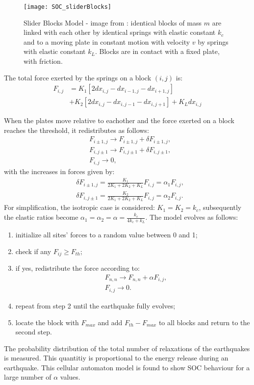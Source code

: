 \begin{figure}[!h]
  \centering
  \texttt{[image: SOC\_sliderBlocks]}
  \caption{Slider Blocks Model - image from \cite{sliderblock}: identical blocks of mass $m$ are linked with each other by identical springs with elastic constant $k_c$ and to a moving plate in constant motion with velocity $v$ by springs with elastic constant $k_L$. Blocks are in contact with a fixed plate, with friction.}
  \label{fig:sliderBlock}
\end{figure}

The total force exerted by the springs on a block $(i,j)$ is:
\begin{align}
F_{i,j} &= K_1[2dx_{i,j}-dx_{i-1,j}-dx_{i+1,j}]\\
&+K_2[2dx_{i,j}-dx_{i,j-1}-dx_{i,j+1}]+K_Ldx_{i,j}
\end{align}

When the plates move relative to eachother and the force exerted on a block reaches the threshold, it redistributes as follows:
\begin{align}
&F_{i \pm 1,j} \to F_{i \pm 1,j} + \delta F_{i \pm 1,j},\\
&F_{i,j \pm 1} \to F_{i,j \pm 1} + \delta F_{i,j \pm 1},\\
&F_{i,j} \to 0,
\end{align}
with the increases in forces given by:
\begin{align}
& \delta F_{i \pm 1,j} = \frac{K_1}{2K_1+2K_2+K_L}F_{i,j} = \alpha_1 F_{i,j}, \\
& \delta F_{i,j \pm 1} = \frac{K_2}{2K_1+2K_2+K_L}F_{i,j} = \alpha_2 F_{i,j}.
\end{align}
For simplification, the isotropic case is considered: $K_1 = K_2 = k_c$, subsequently the elastic ratios become $\alpha_1 = \alpha_2 = \alpha = \frac{k_c}{4k_c+k_L}$.
The model evolves as follows:
\begin{enumerate}
	\item initialize all sites' forces to a random value between 0 and 1;
	\item check if any $F_{ij} \geq F_{th}$;
	\item if yes, redistribute the force according to:
	\begin{align}
	&F_{n,n} \to F_{n,n} + \alpha F_{i,j},\\
	&F_{i,j} \to 0.
	\end{align}
	\item repeat from step 2 until the earthquake fully evolves;
	\item locate the block with $F_{max}$ and add $F_{th}-F_{max}$ to all blocks and return to the second step.
\end{enumerate}
The probability distribution of the total number of relaxations of the earthquakes is measured. This quantitiy is proportional to the energy release during an earthquake. This cellular automaton model is found to show SOC behaviour for a large number of $\alpha$ values.\par 





